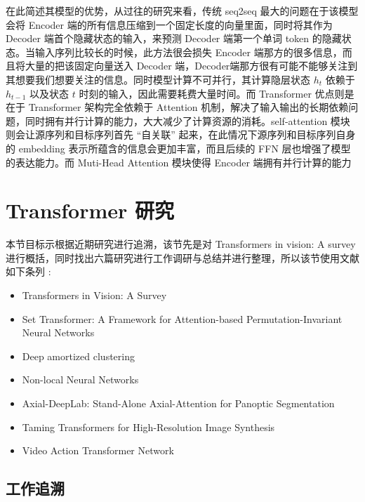 在此简述其模型的优势，从过往的研究来看，传统 seq2seq 最大的问题在于该模型会将 Encoder 端的所有信息压缩到一个固定长度的向量里面，同时将其作为 Decoder 端首个隐藏状态的输入，来预测 Decoder 端第一个单词 token 的隐藏状态。当输入序列比较长的时候，此方法很会损失 Encoder 端那方的很多信息，而且将大量的把该固定向量送入 Decoder 端，Decoder端那方很有可能不能够关注到其想要我们想要关注的信息。同时模型计算不可并行，其计算隐层状态 $h_t$ 依赖于 $h_{t-1}$ 以及状态 $t$ 时刻的输入，因此需要耗费大量时间。而 Transformer 优点则是在于 Transformer 架构完全依赖于 Attention 机制，解决了输入输出的长期依赖问题，同时拥有并行计算的能力，大大减少了计算资源的消耗。self-attention 模块则会让源序列和目标序列首先 “自关联” 起来，在此情况下源序列和目标序列自身的 embedding 表示所蕴含的信息会更加丰富，而且后续的 FFN 层也增强了模型的表达能力。而 Muti-Head Attention 模块使得 Encoder 端拥有并行计算的能力


\section{Transformer 研究}

本节目标示根据近期研究进行追溯，该节先是对 Transformers in vision: A survey \cite{khan2021transformers} 进行概括，同时找出六篇研究进行工作调研与总结并进行整理，所以该节使用文献如下条列 :

\begin{itemize}
\item Transformers in Vision: A Survey
\item Set Transformer: A Framework for Attention-based Permutation-Invariant Neural Networks
\item Deep amortized clustering
\item Non-local Neural Networks
\item Axial-DeepLab: Stand-Alone Axial-Attention for Panoptic Segmentation
\item Taming Transformers for High-Resolution Image Synthesis
\item Video Action Transformer Network
\end{itemize}


\subsection{工作追溯}

